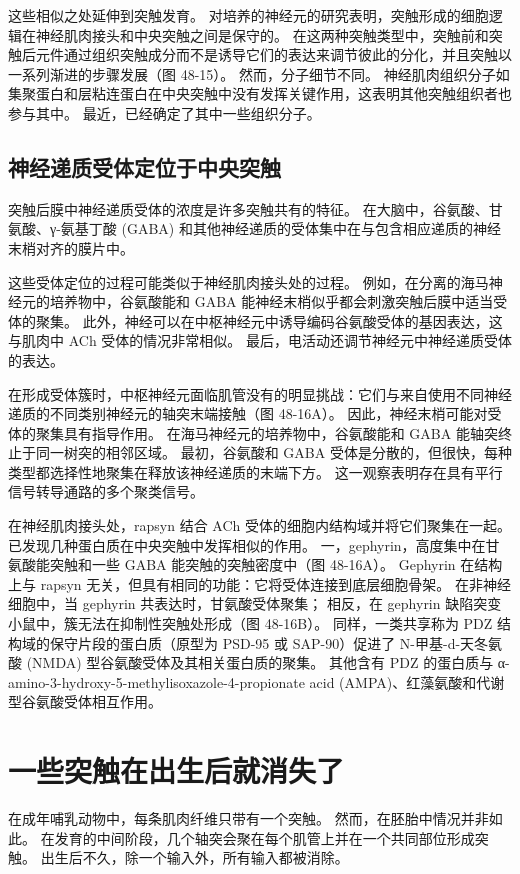 这些相似之处延伸到突触发育。 对培养的神经元的研究表明，突触形成的细胞逻辑在神经肌肉接头和中央突触之间是保守的。 在这两种突触类型中，突触前和突触后元件通过组织突触成分而不是诱导它们的表达来调节彼此的分化，并且突触以一系列渐进的步骤发展（图 48-15）。 然而，分子细节不同。 神经肌肉组织分子如集聚蛋白和层粘连蛋白在中央突触中没有发挥关键作用，这表明其他突触组织者也参与其中。 最近，已经确定了其中一些组织分子。

\subsection{神经递质受体定位于中央突触}
突触后膜中神经递质受体的浓度是许多突触共有的特征。 在大脑中，谷氨酸、甘氨酸、γ-氨基丁酸 (GABA) 和其他神经递质的受体集中在与包含相应递质的神经末梢对齐的膜片中。

这些受体定位的过程可能类似于神经肌肉接头处的过程。 例如，在分离的海马神经元的培养物中，谷氨酸能和 GABA 能神经末梢似乎都会刺激突触后膜中适当受体的聚集。 此外，神经可以在中枢神经元中诱导编码谷氨酸受体的基因表达，这与肌肉中 ACh 受体的情况非常相似。 最后，电活动还调节神经元中神经递质受体的表达。

在形成受体簇时，中枢神经元面临肌管没有的明显挑战：它们与来自使用不同神经递质的不同类别神经元的轴突末端接触（图 48-16A）。 因此，神经末梢可能对受体的聚集具有指导作用。 在海马神经元的培养物中，谷氨酸能和 GABA 能轴突终止于同一树突的相邻区域。 最初，谷氨酸和 GABA 受体是分散的，但很快，每种类型都选择性地聚集在释放该神经递质的末端下方。 这一观察表明存在具有平行信号转导通路的多个聚类信号。

在神经肌肉接头处，rapsyn 结合 ACh 受体的细胞内结构域并将它们聚集在一起。 已发现几种蛋白质在中央突触中发挥相似的作用。 一，gephyrin，高度集中在甘氨酸能突触和一些 GABA 能突触的突触密度中（图 48-16A）。 Gephyrin 在结构上与 rapsyn 无关，但具有相同的功能：它将受体连接到底层细胞骨架。 在非神经细胞中，当 gephyrin 共表达时，甘氨酸受体聚集； 相反，在 gephyrin 缺陷突变小鼠中，簇无法在抑制性突触处形成（图 48-16B）。 同样，一类共享称为 PDZ 结构域的保守片段的蛋白质（原型为 PSD-95 或 SAP-90）促进了 N-甲基-d-天冬氨酸 (NMDA) 型谷氨酸受体及其相关蛋白质的聚集。 其他含有 PDZ 的蛋白质与 α-amino-3-hydroxy-5-methylisoxazole-4-propionate acid (AMPA)、红藻氨酸和代谢型谷氨酸受体相互作用。


\section{一些突触在出生后就消失了}

在成年哺乳动物中，每条肌肉纤维只带有一个突触。 然而，在胚胎中情况并非如此。 在发育的中间阶段，几个轴突会聚在每个肌管上并在一个共同部位形成突触。 出生后不久，除一个输入外，所有输入都被消除。

